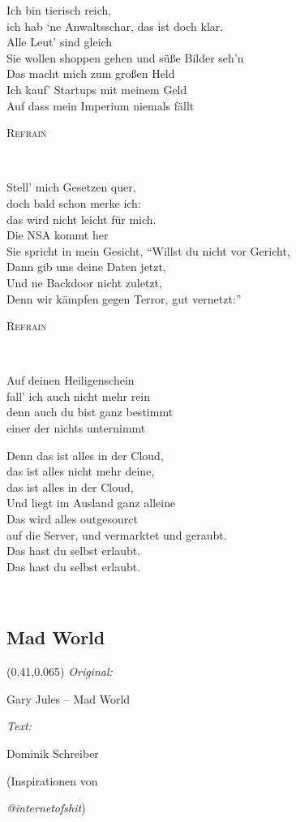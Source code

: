 \documentclass[11pt,a5paper]{article}
\makeatletter
\newcommand\chord[2][l]{\makebox[0pt][#1]{\begin{tabular}[b]{@{}l@{}}#2\\\mbox{}\end{tabular}}}
\newcommand\refrain[1]{\begin{tcolorbox}#1\end{tcolorbox} \ }
\newcommand{\refrefrain}{\refrain{\textsc{Refrain}} \ }
\newcommand\songinfo[2]{\begin{textblock}{0.5}(0.41,0.065)
		\footnotesize 
		\hfill \textit{Original:} \ \ \ \ \ \ \ \ \ \ \ \ \ \ \ \ \ \ \ \ 
		
		\hfill #1
		
		\hfill  \textit{Text:} \ \ \ \ \ \ \ \ \ \ \ \ \ \ \ \ \ \ \ \ 
		
		\hfill #2
	\end{textblock}}
\makeatother
\begin{document}
Ich bin tierisch reich, \\
ich hab ‘ne Anwaltsschar, das ist doch klar. \\
Alle Leut’ sind gleich \\
Sie wollen shoppen gehen und süße Bilder seh’n \\
Das macht mich zum großen Held \\
Ich kauf’ Startups mit meinem Geld \\
Auf dass mein Imperium niemals fällt \\

\refrefrain

Stell’ mich Gesetzen quer, \\
doch bald schon merke ich: \\
das wird nicht leicht für mich. \\
Die NSA kommt her \\
Sie spricht in mein Gesicht, “Willst du nicht vor Gericht, \\
Dann gib uns deine Daten jetzt, \\
Und ne Backdoor nicht zuletzt, \\
Denn wir kämpfen gegen Terror, gut vernetzt:” \\

\refrefrain

\chord{e} Auf deinen Heiligenschein \\
fall’ ich auch nicht mehr \chord{C}rein \\
\chord{e} denn auch du bist ganz bestimmt \\
einer der nichts unter\chord{H}nimmt \\

\refrain{
Denn das ist alles in der Cloud, \\
das ist alles nicht mehr deine, \\
das ist alles in der Cloud, \\
Und liegt im Ausland ganz alleine \\
Das wird alles outgesourct \\
auf die Server, und vermarktet und geraubt. \\
Das hast du selbst erlaubt. \\
Das hast du selbst erlaubt.}

\pagebreak

\subsection{Mad World}
\songinfo{Gary Jules – Mad World}{Dominik Schreiber
	
	\hfill(Inspirationen von 
	
	\hfill \textit{@internetofshit})}
\end{document}

